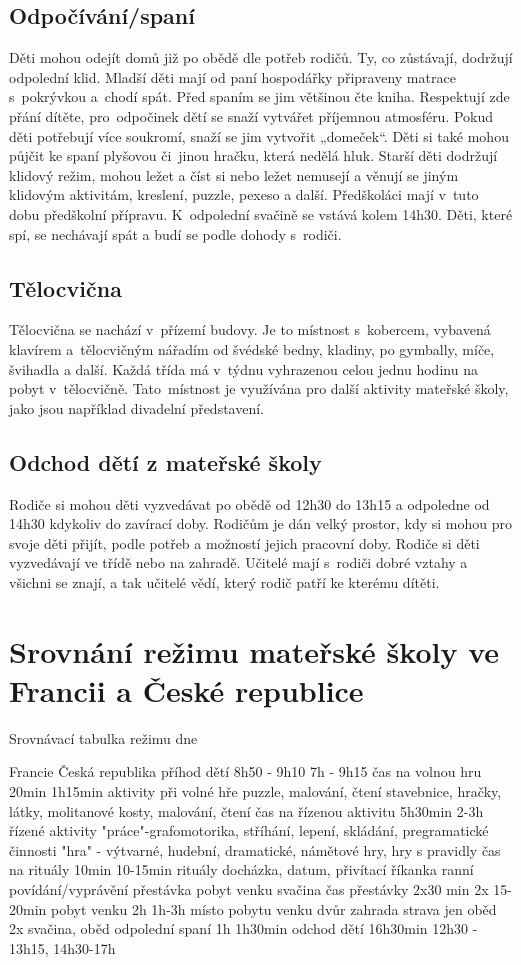 		\subsection{Odpočívání/spaní}
			Děti mohou odejít domů již po obědě dle potřeb rodičů. Ty, co zůstávají, dodržují odpolední klid. Mladší děti mají 	od paní hospodářky připraveny matrace s pokrývkou a chodí spát. Před spaním se jim většinou čte kniha. Respektují zde přání dítěte, pro odpočinek dětí se snaží vytvářet příjemnou atmosféru. Pokud děti potřebují více soukromí, snaží se jim vytvořit „domeček“. Děti si také mohou půjčit ke spaní plyšovou či jinou hračku, která nedělá hluk. Starší děti dodržují klidový režim, mohou ležet a číst si nebo ležet nemusejí a věnují se jiným klidovým aktivitám, kreslení, puzzle, pexeso a další.  Předškoláci mají v tuto dobu předškolní přípravu. K odpolední svačině se vstává kolem 14h30. Děti, které spí, se nechávají spát a budí se podle dohody s rodiči.

		\subsection{Tělocvična}
			Tělocvična se nachází v přízemí budovy. Je to místnost s kobercem, vybavená klavírem a tělocvičným nářadím od švédské bedny, kladiny, po gymbally, míče, švihadla a další. Každá třída má v týdnu vyhrazenou celou jednu hodinu na pobyt v tělocvičně. Tato místnost je využívána pro další aktivity mateřské školy, jako jsou například divadelní představení. 

		\subsection{Odchod dětí z mateřské školy}
			Rodiče si mohou děti vyzvedávat po obědě od 12h30 do 13h15 a odpoledne od 14h30 kdykoliv do zavírací doby. Rodičům je dán velký prostor, kdy si mohou pro svoje děti přijít, podle potřeb a možností jejich pracovní doby. Rodiče si děti vyzvedávají ve třídě nebo na zahradě. Učitelé mají s rodiči dobré vztahy a všichni se znají, a tak učitelé vědí, který rodič patří ke kterému dítěti.

	\section{Srovnání režimu mateřské školy ve Francii a České republice}

Srovnávací tabulka režimu dne

Francie
Česká republika
příhod dětí
8h50 - 9h10
7h - 9h15
čas na volnou hru
20min
1h15min
aktivity při volné hře
puzzle, malování, čtení
stavebnice, hračky, látky, molitanové kosty, malování, čtení
čas na řízenou aktivitu
5h30min
2-3h
řízené aktivity
"práce"-grafomotorika, stříhání, lepení, skládání, pregramatické činnosti
"hra" - výtvarné, hudební, dramatické, námětové hry, hry s pravidly
čas na rituály
10min
10-15min
rituály
docházka, datum, přivítací říkanka
ranní povídání/vyprávění
přestávka
pobyt venku
svačina
čas přestávky 
2x30 min
2x 15-20min
pobyt venku
2h
1h-3h
místo pobytu venku
dvůr
zahrada
strava
jen oběd
2x svačina, oběd
odpolední spaní
1h
1h30min
odchod dětí
16h30min
12h30 - 13h15, 14h30-17h

